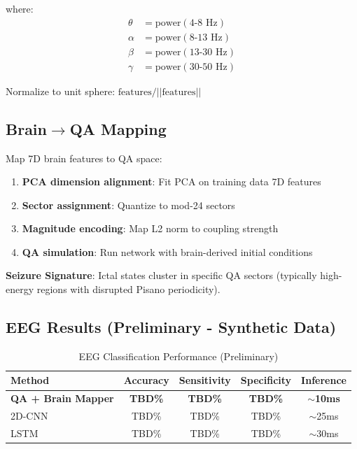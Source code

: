 \documentclass[11pt]{article}
\theoremstyle{remark}
\begin{document}
where:
\begin{align}
\theta &= \text{power}(4\text{-}8 \text{ Hz}) \\
\alpha &= \text{power}(8\text{-}13 \text{ Hz}) \\
\beta &= \text{power}(13\text{-}30 \text{ Hz}) \\
\gamma &= \text{power}(30\text{-}50 \text{ Hz})
\end{align}

Normalize to unit sphere: $\text{features} / ||\text{features}||$

\subsection{Brain$\to$QA Mapping}

Map 7D brain features to QA space:

\begin{enumerate}
\item \textbf{PCA dimension alignment}: Fit PCA on training data 7D features
\item \textbf{Sector assignment}: Quantize to mod-24 sectors
\item \textbf{Magnitude encoding}: Map L2 norm to coupling strength
\item \textbf{QA simulation}: Run network with brain-derived initial conditions
\end{enumerate}

\textbf{Seizure Signature}: Ictal states cluster in specific QA sectors (typically high-energy regions with disrupted Pisano periodicity).

\subsection{EEG Results (Preliminary - Synthetic Data)}

\begin{table}[h]
\centering
\caption{EEG Classification Performance (Preliminary)}
\label{tab:eeg_preliminary}
\begin{tabular}{lcccc}
\toprule
\textbf{Method} & \textbf{Accuracy} & \textbf{Sensitivity} & \textbf{Specificity} & \textbf{Inference} \\
\midrule
\textbf{QA + Brain Mapper} & \textbf{TBD\%} & \textbf{TBD\%} & \textbf{TBD\%} & \textbf{$\sim$10ms} \\
2D-CNN & TBD\% & TBD\% & TBD\% & $\sim$25ms \\
LSTM & TBD\% & TBD\% & TBD\% & $\sim$30ms \\
\bottomrule
\end{tabular}
\end{table}
\end{document}

